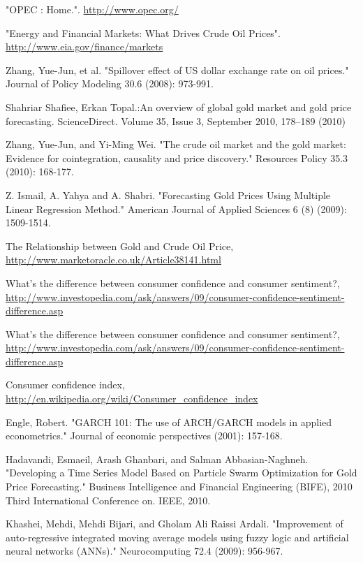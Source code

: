 \documentclass[runningheads]{llncs}
\begin{document}
\begin{thebibliography}{4}
 "OPEC : Home.". \url{http://www.opec.org/}

 "Energy and Financial Markets: What Drives Crude Oil Prices". \url{http://www.eia.gov/finance/markets}

 Zhang, Yue-Jun, et al. "Spillover effect of US dollar exchange rate on oil prices." Journal of Policy Modeling 30.6 (2008): 973-991.

 Shahriar Shafiee,  Erkan Topal.:An overview of global gold market and gold price forecasting. ScienceDirect. Volume 35, Issue 3, September 2010, 178--189 (2010)

 Zhang, Yue-Jun, and Yi-Ming Wei. "The crude oil market and the gold market: Evidence for cointegration, causality and price discovery." Resources Policy 35.3 (2010): 168-177.

Z. Ismail, A. Yahya and A. Shabri. "Forecasting Gold Prices Using Multiple Linear Regression Method." American Journal of Applied Sciences 6 (8) (2009): 1509-1514.

 The Relationship between Gold and Crude Oil Price, \url{http://www.marketoracle.co.uk/Article38141.html}

 What's the difference between consumer confidence and consumer sentiment?, \url{http://www.investopedia.com/ask/answers/09/consumer-confidence-sentiment-difference.asp}

 What's the difference between consumer confidence and consumer sentiment?, \url{http://www.investopedia.com/ask/answers/09/consumer-confidence-sentiment-difference.asp}

 Consumer confidence index, \url{http://en.wikipedia.org/wiki/Consumer_confidence_index}

 Engle, Robert. "GARCH 101: The use of ARCH/GARCH models in applied econometrics." Journal of economic perspectives (2001): 157-168.

Hadavandi, Esmaeil, Arash Ghanbari, and Salman Abbasian-Naghneh. "Developing a Time Series Model Based on Particle Swarm Optimization for Gold Price Forecasting." Business Intelligence and Financial Engineering (BIFE), 2010 Third International Conference on. IEEE, 2010.

Khashei, Mehdi, Mehdi Bijari, and Gholam Ali Raissi Ardali. "Improvement of auto-regressive integrated moving average models using fuzzy logic and artificial neural networks (ANNs)." Neurocomputing 72.4 (2009): 956-967.


\end{thebibliography}
\end{document}
